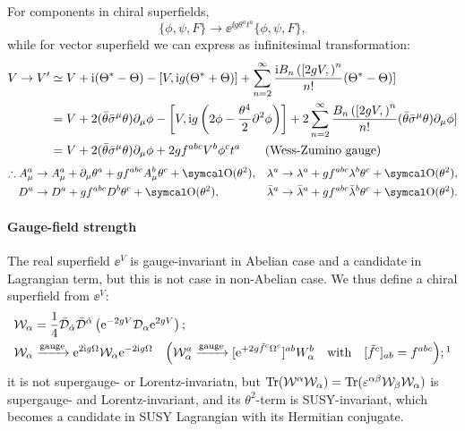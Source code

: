 \documentclass[CheatSheet]{subfiles}
\begin{document}
For components in chiral superfields,
\begin{equation}
   \{\phi,\psi,F\}\to \ee^{\ii g \theta^at^a}\{\phi,\psi,F\},
\end{equation}
while for vector superfield we can express as infinitesimal transformation:
\begin{align}
 V\to V'
&\simeq
V + {\mathrm{i}} (\Theta^*-\Theta)
 - [V,{\mathrm{i}} g(\Theta^*+\Theta)]+
 \sum_{n=2}^{\infty}\frac{{\mathrm{i}} B_n\left([2gV,\right)^n}{n!} (\Theta^*-\Theta)]
\\&=
V +2(\bar\theta\bar\sigma^{\mu}\theta)\partial_{\mu}\phi
 - \left[V,{\mathrm{i}} g\left(2\phi-\frac{\theta^4}2\partial^2\phi\right)\right]
 +2\sum_{n=2}^{\infty}\frac{B_n\left([2gV,\right)^n}{n!}(\bar\theta\bar\sigma^{\mu}\theta)\partial_{\mu}\phi]
\\&=
V +2(\bar\theta\bar\sigma^{\mu}\theta)\partial_{\mu}\phi
 +2 g f^{abc}V^b\phi^ct^a
\qquad\text{(Wess-Zumino gauge)}
\end{align}
\begin{equation}
\begin{split}
   \therefore A_\mu^a&\to A^a_\mu+\partial_\mu \theta^a
   + g f^{abc}A_\mu^b\theta^c  + \Order(\theta^2),
 &\lambda^a&\to\lambda^a+gf^{abc}\lambda^b\theta^c+\Order(\theta^2),
 \\
 D^a&\to D^a+gf^{abc}D^b\theta^c+\Order(\theta^2),
& \blambda^a&\to\blambda^a+gf^{abc}\blambda^b\theta^c + \Order(\theta^2).
\end{split}
\end{equation}
\paragraph{Gauge-field strength}
The real superfield $\ee^{V}$ is gauge-invariant in Abelian case and a candidate in Lagrangian term, but this is not case in non-Abelian case.
We thus define a chiral superfield from $\ee^{V}$:
\begin{align}
& \mathcal W_\alpha = \frac14\bar{\mathcal D}_\dalpha\bar{\mathcal D}^\dalpha\left(\ee^{-2gV}{\mathcal D}_\alpha\ee^{2gV}\right);\\
&\mathcal W_\alpha\xrightarrow{\text{gauge}}
\ee^{2\ii g \Omega}\mathcal W_{\alpha}\ee^{-2\ii g \Omega}
\quad
\Bigl(
\mathcal W_\alpha^a\xrightarrow{\text{gauge}}[\ee^{+2g \tilde f^c \Omega^c}]^{ab}W_\alpha^b
\text{\quad with\quad$[\tilde f^c]_{ab}=f^{abc}$}
\Bigr);\footnotemark
\end{align}%
%
it is not supergauge- or Lorentz-invariatn, but $\operatorname{\mathrm{Tr}}(\mathcal W^\alpha \mathcal W_\alpha) = \operatorname{\mathrm{Tr}}(\varepsilon^{\alpha\beta}\mathcal W_\beta \mathcal W_\alpha)$ is supergauge- and Lorentz-invariant, and its $\theta^2$-term is SUSY-invariant, which becomes a candidate in SUSY Lagrangian with its Hermitian conjugate.
\end{document}
